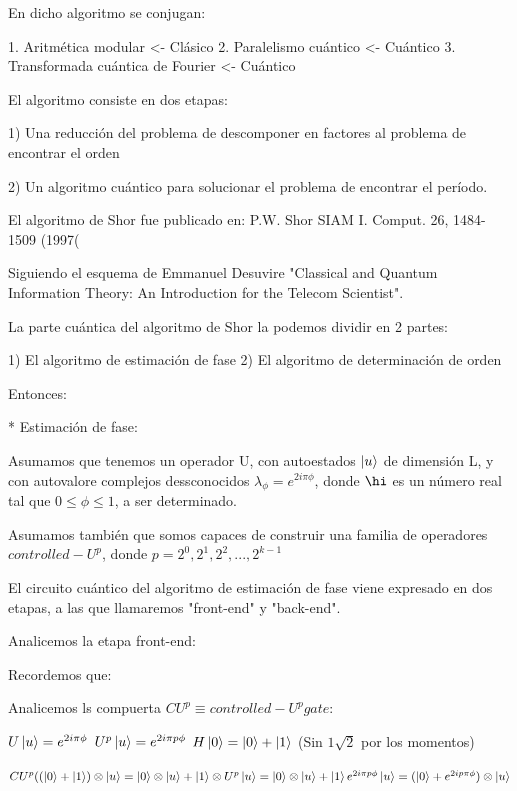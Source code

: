 \documentclass[11pt, spanish]{report}
\begin{document}
En dicho algoritmo se conjugan:

1. Aritmética modular <- Clásico
2. Paralelismo cuántico <- Cuántico
3. Transformada cuántica de Fourier <- Cuántico

El algoritmo consiste en dos etapas:

1) Una reducción del problema de descomponer en factores al problema de encontrar el orden

2) Un algoritmo cuántico para solucionar el problema de encontrar el período.

El algoritmo de Shor fue publicado en: P.W. Shor SIAM I. Comput. 26, 1484-1509 (1997(

Siguiendo el esquema de Emmanuel Desuvire "Classical and Quantum Information Theory: An Introduction for the Telecom Scientist".

La parte cuántica del algoritmo de Shor la podemos dividir en 2 partes:

1) El algoritmo de estimación de fase
2) El algoritmo de determinación de orden

Entonces:

* Estimación de fase:

Asumamos que tenemos un operador U, con autoestados $\ket{u}$ de dimensión L, y con autovalore complejos dessconocidos $\lambda_\phi = e^{2 i \pi \phi}$, donde $\hi$ es un número real tal que $0 \leq \phi \leq 1$, a ser determinado.

Asumamos también que somos capaces de construir una familia de operadores $controlled-U^p$, donde $p = 2^0, 2^1, 2^2, ..., 2^{k-1}$

El circuito cuántico del algoritmo de estimación de fase viene expresado en dos etapas, a las que llamaremos "front-end" y "back-end".

Analicemos la etapa front-end:


Recordemos que:


Analicemos ls compuerta $CU^p \equiv controlled-U^p gate$:


$U \ket{u} = e^{2 i \pi \phi}$
$U^p \ket{u} = e^{2 i \pi p \phi}$
$H \ket{0} = \ket{0} + \ket{1}$ (Sin $1\sqrt{2}$ por los momentos)

$CU^p ((\ket{0} + \ket{1}) \otimes \ket{u} = \ket{0} \otimes \ket{u} + \ket{1} \otimes U^p \ket{u} = \ket{0} \otimes \ket{u} + \ket{1} e^{2i \pi p \phi} \ket{u} = (\ket{0} + e^{2 i p \pi \phi}) \otimes \ket{u}$
\end{document}
